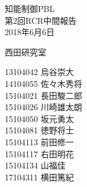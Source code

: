 \begin{titlepage}

  \vspace*{25mm}

  \begin{center}
    {\huge 知能制御PBL\\}
    \vspace{10mm}
    {\Huge 第2回RCR中間報告\\}
    \vspace{20mm}
    {\Large 2018年6月6日}

    \vspace{15mm}

    {\LARGE 西田研究室\\}

    \vspace{15mm}

    {\Large
   13104042 烏谷崇大    \\
   14104055 佐々木秀将\\
   15104021 長田駿二郎\\
   15104026 川崎雄太朗\\
   15104050 坂元勇太    \\
   15104081 徳野将士    \\
   15104113 前田修一    \\
   15104117 右田明花    \\
   15104134 山福佳        \\
   17104311 横田篤紀    \\
}

  \end{center}

\end{titlepage}
